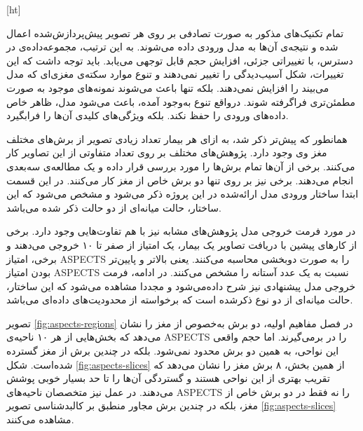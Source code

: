 
[ht]

تمام تکنیک‌های مذکور به صورت تصادفی بر روی هر تصویر پیش‌پردازش‌شده اعمال شده و نتیجه‌ی آن‌ها
به مدل ورودی داده می‌شوند.
به این ترتیب، مجموعه‌داده‌ی در دسترس، با تغییراتی جزئی، افزایش حجم قابل توجهی می‌یابد.
باید توجه داشت که این تغییرات، شکل آسیب‌دیدگی را تغییر نمی‌دهند و تنوع موارد سکته‌ی مغزی‌ای که مدل می‌بیند را 
افزایش نمی‌دهند.
بلکه تنها باعث می‌شوند نمونه‌های موجود به صورت مطمئن‌تری فراگرفته شوند.
درواقع تنوع به‌وجود آمده، باعث می‌شود مدل، ظاهر خاص داده‌های ورودی را حفظ نکند. بلکه ویژگی‌های کلیدی آن‌ها را فرابگیرد.


همانطور که پیش‌تر ذکر شد، به ازای هر بیمار تعداد زیادی تصویر از برش‌های مختلف مغز وی وجود دارد.
پژوهش‌ها‌ی مختلف بر روی تعداد متفاوتی از این تصاویر کار می‌کنند.
برخی از آن‌ها تمام برش‌ها را مورد بررسی قرار داده و یک مطالعه‌ی سه‌بعدی انجام می‌دهند.
برخی نیز بر روی تنها دو برش خاص از مغز کار می‌کنند.
در این قسمت ابتدا ساختار ورودی مدل ارائه‌شده در این پروژه ذکر می‌شود
و مشخص می‌شود که
این ساختار، حالت میانه‌ای از دو حالت ذکر شده می‌باشد.

در مورد فرمت خروجی مدل پژوهش‌های مشابه نیز با هم تفاوت‌هایی وجود دارد.
برخی از کارهای پیشین با دریافت تصاویر یک بیمار، یک امتیاز از صفر تا ۱۰ خروجی می‌دهند و برخی، امتیاز ASPECTS را به صورت دوبخشی محاسبه می‌کنند.
یعنی بالاتر و پایین‌تر بودن امتیاز ASPECTS نسبت به یک عدد آستانه را مشخص می‌کنند.
در ادامه، فرمت خروجی مدل پیشنهادی نیز شرح داده‌می‌شود و
مجددا مشاهده می‌شود که این ساختار، حالت میانه‌ای از دو نوع ذکرشده است که برخواسته از محدودیت‌های داده‌ای می‌باشد.


تصویر \ref{fig:aspects-regions}
در فصل مفاهیم اولیه، دو برش به‌خصوص از مغز را نشان می‌دهد که بخش‌هایی از هر ۱۰ ناحیه‌ی ASPECTS را در برمی‌گیرند.
اما حجم واقعی این نواحی، به همین دو برش محدود نمی‌شود.
بلکه در چندین برش از مغز گسترده شده‌است.
شکل \ref{fig:aspects-slices}
از همین بخش، ۸ برش مغز را نشان می‌دهد که تقریب بهتری از این نواحی هستند و گستردگی آن‌ها را تا حد بسیار خوبی پوشش می‌دهند.
در عمل نیز متخصصان
ناحیه‌های ASPECTS را 
 نه فقط در دو برش خاص از مغز، بلکه 
 در چندین برش مجاور منطبق بر کالبدشناسی تصویر 
 \ref{fig:aspects-slices}
 مشاهده می‌کنند.

